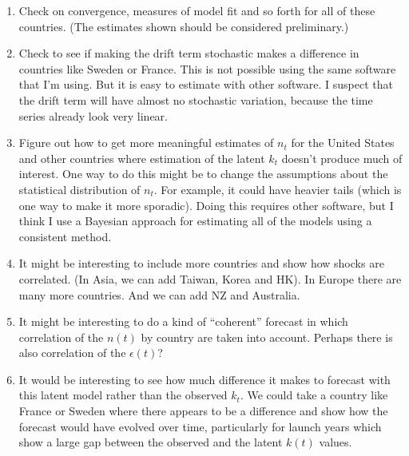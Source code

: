 \documentclass[12pt]{article}
\begin{document}
\begin{enumerate}

  \item Check on convergence, measures of model fit and so forth for
    all of these countries. (The estimates shown should be considered
    preliminary.)

  \item Check to see if making the drift term stochastic makes a
    difference in countries like Sweden or France. This is not
    possible using the same software that I'm using. But it is easy to
    estimate with other software. I suspect that the drift term will
    have almost no stochastic variation, because the time series
    already look very linear.

  \item Figure out how to get more meaningful estimates of  $n_t$ for the
    United States and other countries where estimation of the latent
    $k_t$ doesn't produce much of interest. One way to do this might
    be to change the assumptions about the statistical distribution of
    $n_t$. For example, it could have heavier tails (which is one way
    to make it more sporadic). Doing this requires other software, but
    I think I use a Bayesian approach for estimating all of the models
    using a consistent method.

  \item It might be interesting to include more countries and show how
    shocks are correlated. (In Asia, we can add Taiwan, Korea and
    HK). In Europe there are many more countries. And we can add NZ
    and Australia.

  \item It might be interesting to do a kind of ``coherent'' forecast
    in which correlation of the $n(t)$ by country are taken into
    account. Perhaps there is also correlation of the $\epsilon(t)$?

  \item It would be interesting to see how much difference it makes to
    forecast with this latent model rather than the observed $k_t$. We
    could take a country like France or Sweden where there appears to
    be a difference and show how the forecast would have evolved over
    time, particularly for launch years which show a large gap between
    the observed and the latent $k(t)$ values.

\end{enumerate}
\end{document}
